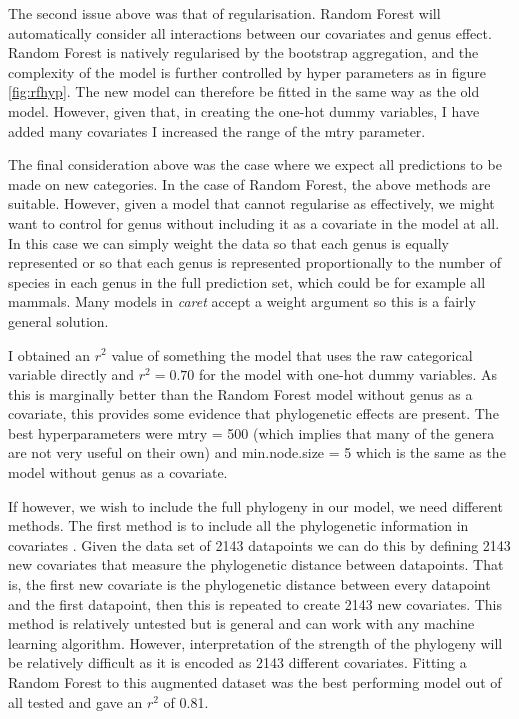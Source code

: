 \documentclass[10pt,]{article}
\begin{document}
The second issue above was that of regularisation. Random Forest will automatically consider all interactions between our covariates and genus effect. Random Forest is natively regularised by the bootstrap aggregation, and the complexity of the model is further controlled by hyper parameters as in figure \ref{fig:rfhyp}. The new model can therefore be fitted in the same way as the old model. However, given that, in creating the one-hot dummy variables, I have added many covariates I increased the range of the mtry parameter.

The final consideration above was the case where we expect all predictions to be made on new categories. In the case of Random Forest, the above methods are suitable. However, given a model that cannot regularise as effectively, we might want to control for genus without including it as a covariate in the model at all. In this case we can simply weight the data so that each genus is equally represented or so that each genus is represented proportionally to the number of species in each genus in the full prediction set, which could be for example all mammals. Many models in \emph{caret} accept a weight argument so this is a fairly general solution.

I obtained an \(r^2\) value of something the model that uses the raw categorical variable directly and \(r^2 = 0.70\) for the model with one-hot dummy variables. As this is marginally better than the Random Forest model without genus as a covariate, this provides some evidence that phylogenetic effects are present. The best hyperparameters were mtry = 500 (which implies that many of the genera are not very useful on their own) and min.node.size = 5 which is the same as the model without genus as a covariate.

If however, we wish to include the full phylogeny in our model, we need different methods. The first method is to include all the phylogenetic information in covariates \citep{hengl2018random}. Given the data set of 2143 datapoints we can do this by defining 2143 new covariates that measure the phylogenetic distance between datapoints. That is, the first new covariate is the phylogenetic distance between every datapoint and the first datapoint, then this is repeated to create 2143 new covariates. This method is relatively untested but is general and can work with any machine learning algorithm. However, interpretation of the strength of the phylogeny will be relatively difficult as it is encoded as 2143 different covariates. Fitting a Random Forest to this augmented dataset was the best performing model out of all tested and gave an \(r^2\) of 0.81.
\end{document}
